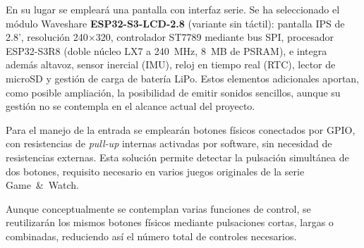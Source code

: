 \documentclass[../main.tex]{subfiles}
\begin{document}
	En su lugar se empleará una pantalla con interfaz serie. Se ha seleccionado el módulo Waveshare \textbf{ESP32-S3-LCD-2.8} (variante sin táctil): pantalla IPS de 2.8', resolución 240×320, controlador ST7789 mediante bus SPI, procesador ESP32-S3R8 (doble núcleo LX7 a 240~MHz, 8~MB de PSRAM), e integra además altavoz, sensor inercial (IMU), reloj en tiempo real (RTC), lector de microSD y gestión de carga de batería LiPo. Estos elementos adicionales aportan, como posible ampliación, la posibilidad de emitir sonidos sencillos, aunque su gestión no se contempla en el alcance actual del proyecto.

	Para el manejo de la entrada se emplearán botones físicos conectados por GPIO, con resistencias de \textit{pull-up} internas activadas por software, sin necesidad de resistencias externas. Esta solución permite detectar la pulsación simultánea de dos botones, requisito necesario en varios juegos originales de la serie Game~\&~Watch.

	Aunque conceptualmente se contemplan varias funciones de control, se reutilizarán los mismos botones físicos mediante pulsaciones cortas, largas o combinadas, reduciendo así el número total de controles necesarios.
\end{document}
